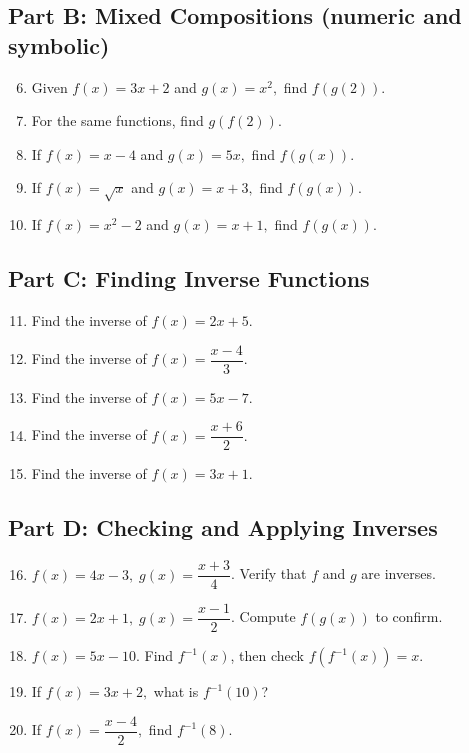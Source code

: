 \documentclass[14pt]{extarticle}
\begin{document}
\subsection*{Part B: Mixed Compositions (numeric and symbolic)}
\begin{enumerate}
  \setcounter{enumi}{5}
  \item Given \(f(x) = 3x + 2\) and \(g(x) = x^2,\) find \(f(g(2))\).
  \item For the same functions, find \(g(f(2))\).
  \item If \(f(x) = x - 4\) and \(g(x) = 5x,\) find \(f(g(x))\).
  \item If \(f(x) = \sqrt{x}\) and \(g(x) = x + 3,\) find \(f(g(x))\).
  \item If \(f(x) = x^2 - 2\) and \(g(x) = x + 1,\) find \(f(g(x))\).
\end{enumerate}

\subsection*{Part C: Finding Inverse Functions}
\begin{enumerate}
  \setcounter{enumi}{10}
  \item Find the inverse of \(f(x) = 2x + 5.\)
  \item Find the inverse of \(f(x) = \dfrac{x - 4}{3}.\)
  \item Find the inverse of \(f(x) = 5x - 7.\)
  \item Find the inverse of \(f(x) = \dfrac{x + 6}{2}.\)
  \item Find the inverse of \(f(x) = 3x + 1.\)
\end{enumerate}

\subsection*{Part D: Checking and Applying Inverses}
\begin{enumerate}
  \setcounter{enumi}{15}
  \item \(f(x) = 4x - 3,\; g(x) = \dfrac{x + 3}{4}\). Verify that \(f\) and \(g\) are inverses.
  \item \(f(x) = 2x + 1,\; g(x) = \dfrac{x - 1}{2}\). Compute \(f(g(x))\) to confirm.
  \item \(f(x) = 5x - 10.\) Find \(f^{-1}(x)\), then check \(f(f^{-1}(x)) = x.\)
  \item If \(f(x) = 3x + 2,\) what is \(f^{-1}(10)\)?
  \item If \(f(x) = \dfrac{x - 4}{2},\) find \(f^{-1}(8)\).
\end{enumerate}
\end{document}
